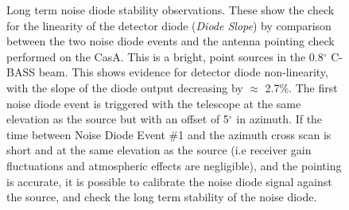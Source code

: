 \begin{figure}
 \centering
{}
\hspace{0.2cm}
\caption{Long term noise diode stability observations. These show the check for the linearity of the detector diode (\textit{Diode Slope}) by comparison between the two noise diode events and the antenna pointing check performed on  the CasA. This is a bright, point sources in the 0.8$^{\circ}$ C-BASS beam. This shows evidence for detector diode non-linearity, with the slope of the diode output decreasing by $\approx$ 2.7\%. The first noise diode event is triggered with the telescope at the same elevation as the source but with an offset of 5$^{\circ}$ in azimuth. If the time between Noise Diode Event \#1 and the azimuth cross scan is short and at the same elevation as the source (i.e receiver gain fluctuations and atmospheric effects are negligible), and the pointing is accurate, it is possible to calibrate the noise diode signal against the source, and check the long term stability of the noise diode.  }
\label{fig:calCheck}

\end{figure}




